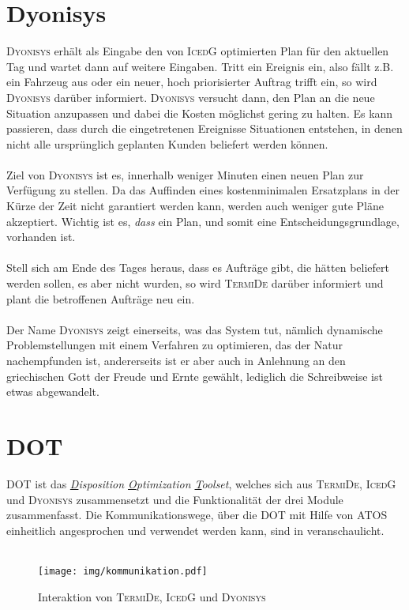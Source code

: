 \section{Dyonisys}\label{chp:umfeld_dyonisys}
\textsc{Dyonisys} erhält als Eingabe den von \textsc{IcedG} optimierten Plan für den aktuellen Tag und wartet dann auf weitere Eingaben. Tritt ein Ereignis ein, also fällt z.B. ein Fahrzeug aus oder ein neuer, hoch priorisierter Auftrag trifft ein, so wird \textsc{Dyonisys} darüber informiert. \textsc{Dyonisys} versucht dann, den Plan an die neue Situation anzupassen und dabei die Kosten möglichst gering zu halten. Es kann passieren, dass durch die eingetretenen Ereignisse Situationen entstehen, in denen nicht alle ursprünglich geplanten Kunden beliefert werden können. \\
\\
Ziel von \textsc{Dyonisys} ist es, innerhalb weniger Minuten einen neuen Plan zur Verfügung zu stellen. Da das Auffinden eines kostenminimalen Ersatzplans in der Kürze der Zeit nicht garantiert werden kann, werden auch weniger gute Pläne akzeptiert. Wichtig ist es, \emph{dass} ein Plan, und somit eine Entscheidungsgrundlage, vorhanden ist. \\
\\
Stell sich am Ende des Tages heraus, dass es Aufträge gibt, die hätten beliefert werden sollen, es aber nicht wurden, so wird \textsc{TermiDe} darüber informiert und plant die betroffenen Aufträge neu ein. \\
\\
Der Name \textsc{Dyonisys} zeigt einerseits, was das System tut, nämlich dynamische Problemstellungen mit einem Verfahren zu optimieren, das der Natur nachempfunden ist, andererseits ist er aber auch in Anlehnung an den griechischen Gott der Freude und Ernte gewählt, lediglich die Schreibweise ist etwas abgewandelt.


\section{DOT}\label{chp:dot}
\textsc{DOT} ist das \emph{\underline{D}isposition \underline{O}ptimization \underline{T}oolset}, welches sich aus \textsc{TermiDe}, \textsc{IcedG} und \textsc{Dyonisys} zusammensetzt und die Funktionalität der drei Module zusammenfasst. Die Kommunikationswege, über die \textsc{DOT} mit Hilfe von \textsc{ATOS} einheitlich angesprochen und verwendet werden kann, sind in  veranschaulicht. \\
\\
\begin{figure}[h!]
  \centering
  \texttt{[image: img/kommunikation.pdf]}
  \caption{Interaktion von \textsc{TermiDe}, \textsc{IcedG} und \textsc{Dyonisys}}
  \label{fig:dot}
\end{figure}


